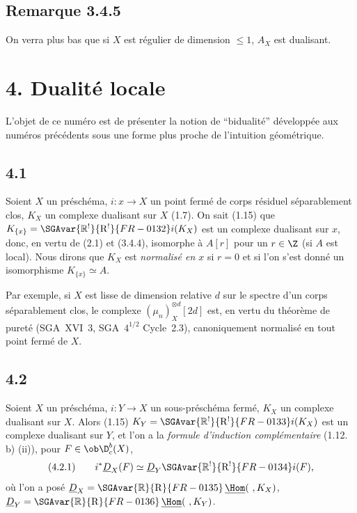 \subsection*{Remarque 3.4.5}
On verra plus bas que si $X$ est régulier de dimension $\leqslant 1$, $A_X$ est dualisant.

\section*{4. Dualité locale}

L'objet de ce numéro est de présenter la notion de ``bidualité'' développée aux numéros précédents sous une forme plus proche de l'intuition géométrique.

\subsection*{4.1}
Soient $X$ un préschéma, $i:x\to X$ un point fermé de corps résiduel séparablement clos, $K_X$ un complexe dualisant sur $X$ (1.7). On sait (1.15) que $K_{\{x\}}=\SGAvar{\mathbb{R}^{!}}{\mathrm{R}^{!}}{FR-0132}i(K_X)$ est un complexe dualisant sur $x$, donc, en vertu de (2.1) et (3.4.4), isomorphe à $A[r]$ pour un $r\in\Z$ (si $A$ est local). Nous dirons que $K_X$ est \emph{normalisé en $x$} si $r=0$ et si l'on s'est donné un isomorphisme $K_{\{x\}}\simeq A$.

Par
exemple, si $X$ est lisse de dimension relative $d$ sur le spectre d'un corps séparablement clos, le complexe $(\mu_n)_X^{\otimes d}[2d]$ est, en vertu du théorème de pureté (SGA~XVI~3, SGA~$4^{1/2}$ Cycle~2.3), canoniquement normalisé en tout point fermé de $X$.

\subsection*{4.2}
Soient $X$ un préschéma, $i:Y\to X$ un sous-préschéma fermé, $K_X$ un complexe dualisant sur $X$. Alors (1.15) $K_Y=\SGAvar{\mathbb{R}^{!}}{\mathrm{R}^{!}}{FR-0133}i(K_X)$ est un complexe dualisant sur $Y$, et l'on a la \emph{formule d'induction complémentaire} (1.12. b) (ii)), pour $F\in \ob\D_c^b(X)$,
\[
(4.2.1)\qquad i^*\underline{D}_X(F)\simeq\underline{D}_Y\SGAvar{\mathbb{R}^{!}}{\mathrm{R}^{!}}{FR-0134}i(F),
\]
où l'on a posé $\underline{D}_X=\SGAvar{\mathbb{R}}{\mathrm{R}}{FR-0135}\,\underline{\Hom}(\ ,K_X)$, $\underline{D}_Y=\SGAvar{\mathbb{R}}{\mathrm{R}}{FR-0136}\,\underline{\Hom}(\ ,K_Y)$.


